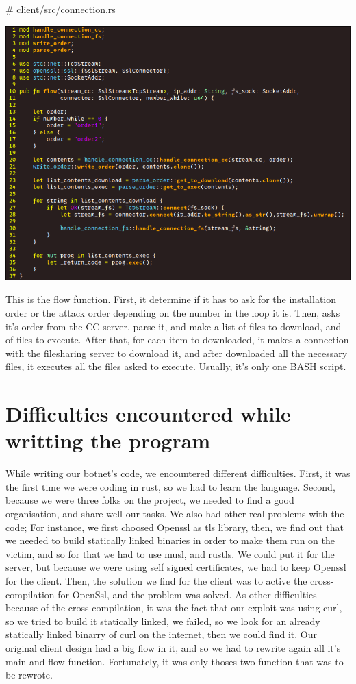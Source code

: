\documentclass[../main.tex]{subfiles}
\begin{document}
    \# client/src/connection.rs

    \includegraphics[width=450pt]{client_flow.png}

    This is the flow function.
    First, it determine if it has to ask for the installation order or the attack order depending on the number in the loop it is.
    Then, asks it's order from the CC server, parse it, and make a list of files to download, and of files to execute.
    After that, for each item to downloaded, it makes a connection with the filesharing server to download it, and after downloaded all the necessary files, it executes all the files asked to execute.
    Usually, it's only one BASH script.


	\vspace{10pt}

	\section{Difficulties encountered while writting the program}

    While writing our botnet's code, we encountered different difficulties.
    First, it was the first time we were coding in rust, so we had to learn the language.
    Second, because we were three folks on the project, we needed to find a good organisation, and share well our tasks.
    We also had other real problems with the code;
    For instance, we first choosed Openssl as tls library, then, we find out that we needed to build statically linked binaries in order to make them run on the victim, and so for that we had to use musl, and rustls.
    We could put it for the server, but because we were using self signed certificates, we had to keep Openssl for the client.
    Then, the solution we find for the client was to active the cross-compilation for OpenSsl, and the problem was solved.
    As other difficulties because of the cross-compilation, it was the fact that our exploit was using curl, so we tried to build it statically linked, we failed, so we look for an already statically linked binarry of curl on the internet, then we could find it.
    Our original client design had a big flow in it, and so we had to rewrite again all it's main and flow function.
    Fortunately, it was only thoses two function that was to be rewrote.
\end{document}
